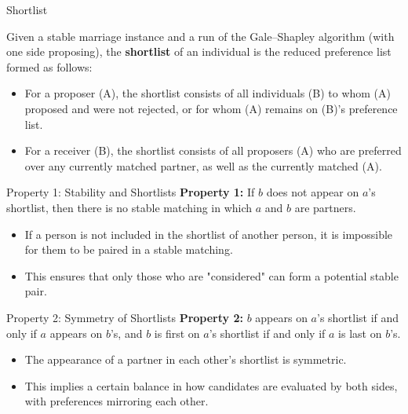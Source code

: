 \documentclass[aspectratio=169,xcolor=dvipsnames]{beamer}
\begin{document}
\begin{frame}{Shortlist}
\begin{definition}[Shortlist]
Given a stable marriage instance and a run of the Gale--Shapley algorithm (with one side proposing), the \textbf{shortlist} of an individual is the reduced preference list formed as follows:

\begin{itemize}
    \item For a proposer (A), the shortlist consists of all individuals (B) to whom (A) proposed and were not rejected, or for whom (A) remains on (B)'s preference list.
    \item For a receiver (B), the shortlist consists of all proposers (A) who are preferred over any currently matched partner, as well as the currently matched (A).
\end{itemize}
\end{definition}
\end{frame}


\begin{frame}{Property 1: Stability and Shortlists}
  \textbf{Property 1:} If \( b \) does not appear on \( a \)'s shortlist, then there is no stable matching in which \( a \) and \( b \) are partners.
\pause
  \begin{itemize}
    \item If a person is not included in the shortlist of another person, it is impossible for them to be paired in a stable matching.
    \item This ensures that only those who are "considered" can form a potential stable pair.
   \end{itemize}  

 
\end{frame}
\begin{frame}{Property 2: Symmetry of Shortlists}
  \textbf{Property 2:} \( b \) appears on \( a \)'s shortlist if and only if \( a \) appears on \( b \)'s, and \( b \) is first on \( a \)'s shortlist if and only if \( a \) is last on \( b \)'s.
\pause
  \begin{itemize}
    \item The appearance of a partner in each other's shortlist is symmetric.
    \item This implies a certain balance in how candidates are evaluated by both sides, with preferences mirroring each other.
  \end{itemize}
\end{frame}
\end{document}
